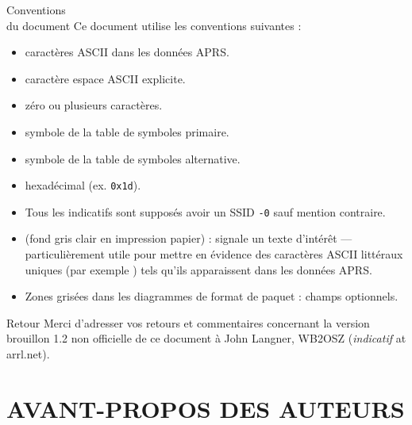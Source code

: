 \begin{aprssideblock}{Conventions\\du document}
Ce document utilise les conventions suivantes :

\begin{itemize}
\tightlist
\item
   caractères ASCII dans les
  données APRS.
\item
   caractère espace ASCII explicite.
\item
   zéro ou plusieurs caractères.
\item
  \makebox[8em][l]{\texttt{/\$}} symbole de la table de symboles primaire.
\item
  \makebox[8em][l]{\texttt{\textbackslash{}\$}} symbole de la table de
  symboles alternative.
\item
   hexadécimal (ex. \texttt{0x1d}).
\item
  Tous les indicatifs sont supposés avoir un SSID \texttt{-0} sauf
  mention contraire.
\item
   (fond gris clair en impression papier) : signale un
  texte d'intérêt --- particulièrement utile pour mettre en évidence des
  caractères ASCII littéraux uniques (par exemple ) tels
  qu'ils apparaissent dans les données APRS.
\item
  Zones grisées dans les diagrammes de format de paquet : champs
  optionnels.
\end{itemize}
\end{aprssideblock}

\begin{aprssideblock}{Retour}
Merci d'adresser vos retours et commentaires concernant la version
brouillon 1.2 non officielle de ce document à John Langner, WB2OSZ
(\textit{indicatif} at arrl.net).
\end{aprssideblock}

\clearpage
\section*{AVANT-PROPOS DES AUTEURS}\label{avant-propos-des-auteurs}


